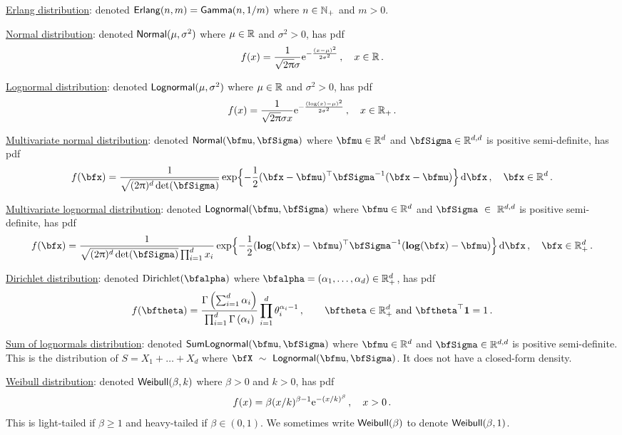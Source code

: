 \underline{Erlang distribution}: denoted $\mathsf{Erlang}(n, m) = \mathsf{Gamma}(n, 1/m)$ where $n \in \mathbb{N}_+$ and $m > 0$.

\underline{Normal distribution}: denoted $\mathsf{Normal}(\mu, \sigma^2)$ where $\mu \in \mathbb{R}$ and $\sigma^2 > 0$, has pdf
\[ f(x) = \frac{1}{\sqrt{2 \uppi} \sigma} \mathrm{e}^{-\frac{(x-\mu)^2}{2 \sigma^2}} \,, \quad x \in \mathbb{R} \,. \]

\underline{Lognormal distribution}: denoted $\mathsf{Lognormal}(\mu, \sigma^2)$ where $\mu \in \mathbb{R}$ and $\sigma^2 > 0$, has pdf
\[ f(x) = \frac{1}{\sqrt{2 \uppi} \sigma x} \mathrm{e}^{-\frac{(\log(x)-\mu)^2}{2 \sigma^2}} \,, \quad x \in \mathbb{R}_+ \,.  \]

\underline{Multivariate normal distribution}: denoted $\NormDist(\bfmu, \bfSigma)$ where $\bfmu \in \RL^d$ and $\bfSigma \in \RL^{d,d}$ is positive semi-definite, has pdf
\[
  f(\bfx) = \frac{1}{\sqrt{(2\pi)^d \det(\bfSigma)}} \exp\Bigl\{ {-}\frac12 (\bfx - \bfmu)^\tr \bfSigma^{-1} (\bfx - \bfmu) \Bigr\} \dd \bfx \,, \quad \bfx \in \RL^d \,.
\]

\underline{Multivariate lognormal distribution}: denoted $\LNDist(\bfmu, \bfSigma)$ where $\bfmu \in \RL^d$ and $\bfSigma~\in~\RL^{d,d}$ is positive semi-definite, has pdf
\[ f(\bfx) = \frac{1}{\sqrt{(2\pi)^d \det(\bfSigma)} \prod_{i=1}^d x_i} \exp\Bigl\{ {-}\frac12 ( \vlog(\bfx) - \bfmu )^\tr \bfSigma^{-1} (\vlog(\bfx) - \bfmu) \Bigr\} \dd \bfx \,, \quad \bfx \in \RL_+^d \,. \]

\underline{Dirichlet distribution}: denoted $\mathrm{Dirichlet}(\bfalpha)$ where $\bfalpha=(\alpha_1,\dots,\alpha_d) \in \RL_+^d$, has pdf
\[
f(\bftheta) = \frac{\Gamma\left(\sum_{i=1}^d \alpha_i\right)}{\prod_{i=1}^d \Gamma\left(\alpha_i \right)} \prod_{i=1}^d \theta_i^{\alpha_i-1} \,,\qquad \bftheta \in \mathbb{R}_+^d \text{ and } \bftheta^\top\bfone = 1  \,.
\]

\underline{Sum of lognormals distribution}: denoted $\SLNDist(\bfmu, \bfSigma)$ where $\bfmu \in \RL^d$ and $\bfSigma \in \RL^{d,d}$ is positive semi-definite. This is the distribution of $S = X_1 + \dots + X_d$ where $\bfX~\sim~\LNDist(\bfmu, \bfSigma)$. It does not have a closed-form density.

\underline{Weibull distribution}: denoted $\mathsf{Weibull}(\beta, k)$ where $\beta > 0$ and $k > 0$, has pdf
\[ f(x) = \beta (x/k)^{\beta-1} \mathrm{e}^{-(x/k)^\beta} \,, \quad x > 0 \,. \]
This is light-tailed if $\beta \ge 1$ and heavy-tailed if $\beta \in (0, 1)$. We sometimes write $\mathsf{Weibull}(\beta)$ to denote $\mathsf{Weibull}(\beta, 1)$.

